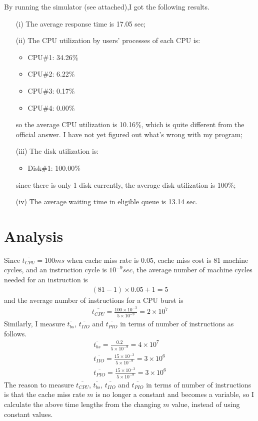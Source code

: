 \documentclass[12pt,letterpaper]{article}
\begin{document}
By running the simulator (see attached),I got the following results.
\begin{itemize}
\item[(i)] The average response time is 17.05 sec;
\item[(ii)] The CPU utilization by users' processes of each CPU is:
\begin{itemize}
\item CPU\#1: 34.26\%
\item CPU\#2:  6.22\%
\item CPU\#3:  0.17\%
\item CPU\#4:  0.00\%
\end{itemize}
so the average CPU utilization is 10.16\%, which is quite different from the official answer. I have not yet figured out what's wrong with my program;
\item[(iii)] The disk utilization is:
\begin{itemize}
\item Disk\#1: 100.00\%
\end{itemize}
since there is only 1 disk currently, the average disk utilization is 100\%;
\item[(iv)] The average waiting time in eligible queue is 13.14 sec.
\end{itemize}

\section{Analysis}
Since $\overline{t_{CPU}} = 100ms$ when cache miss rate is 0.05, cache miss cost is 81 machine cycles, and an instruction cycle is $10^{-9}sec$, the average number of machine cycles needed for an instruction is
\begin{align}
(81-1)\times 0.05+1=5
\end{align}
and the average number of instructions for a CPU burst is
\begin{align}
\overline{t_{CPU}}=\frac{100\times 10^{-3}}{5\times 10^{-9}}=2\times 10^7
\end{align}
Similarly, I measure $\overline{t_{bs}}$, $\overline{t_{IIO}}$ and $\overline{t_{PIO}}$ in terms of number of instructions as follows.
\begin{align}
\overline{t_{bs}}=\frac{0.2}{5\times 10^{-9}}=4\times 10^7\\
\overline{t_{IIO}}=\frac{15\times 10^{-3}}{5\times 10^{-9}}=3\times 10^6\\
\overline{t_{PIO}}=\frac{15\times 10^{-3}}{5\times 10^{-9}}=3\times 10^6
\end{align}
The reason to measure $\overline{t_{CPU}}$, $\overline{t_{bs}}$, $\overline{t_{IIO}}$ and $\overline{t_{PIO}}$ in terms of number of instructions is that the cache miss rate $m$ is no longer a constant and becomes a variable, so I calculate the above time lengths from the changing $m$ value, instead of using constant values.
\end{document}
